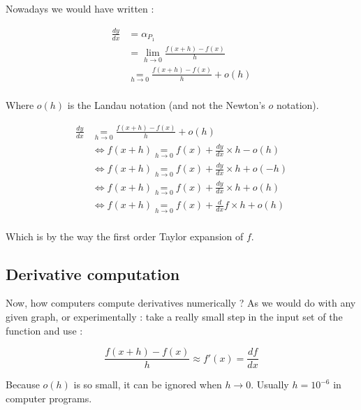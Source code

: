 \documentclass[12pt]{article}
\newcommand\underrel[2]{\mathrel{\mathop{#2}\limits_{#1}}}
\begin{document}
Nowadays we would have written :

\begin{equation*}
    \begin{split}
        \frac{dy}{dx} &= \alpha_{P_1} \\
                    &= \lim_{ h \to 0} \frac{f(x + h) - f(x)}{h} \\
                    & \underrel{h \to 0}{=} \frac{f(x + h) - f(x)}{h} + o(h)  \\
    \end{split}
\end{equation*}

Where $o(h)$ is the Landau notation \cite{wiki_big_O_notation} (and not the Newton's $o$ notation).


\begin{equation*}
    \begin{split}
        \frac{dy}{dx} & \underrel{h \to 0}{=} \frac{f(x + h) - f(x)}{h} + o(h)  \\
                    &\Leftrightarrow f(x + h) \underrel{h \to 0}{=}  f(x) + \frac{dy}{dx} \times h - o(h) \\
                    &\Leftrightarrow  f(x + h) \underrel{h \to 0}{=} f(x) + \frac{dy}{dx} \times h + o(-h) \\
                    &\Leftrightarrow  f(x + h) \underrel{h \to 0}{=} f(x) + \frac{dy}{dx} \times h + o(h) \\
                    &\Leftrightarrow  f(x + h) \underrel{h \to 0}{=} f(x) + \frac{d}{dx}f \times h + o(h) \\
    \end{split}
\end{equation*}

Which is by the way the first order Taylor expansion of $f$.


\subsection{Derivative computation}


Now, how computers compute derivatives numerically ? As we would do with any given graph, or experimentally : take a really small step in the input set of the function and use :

$$
\frac{f(x+h) - f(x)}{h} \approx f'(x) = \frac{df}{dx}
$$

Because $o(h)$ is so small, it can be ignored when $h \rightarrow 0$. Usually $h=10^{-6}$ in computer programs.
\end{document}
